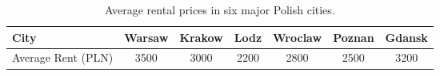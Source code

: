 \begin{table}[h]
    \centering
    \begin{tabular}{lcccccc}
        \toprule
        City & Warsaw & Krakow & Lodz & Wroclaw & Poznan & Gdansk \\
        \midrule
        Average Rent (PLN) & 3500 & 3000 & 2200 & 2800 & 2500 & 3200 \\
        \bottomrule
    \end{tabular}
    \caption{Average rental prices in six major Polish cities.}
    \label{tab:rental_prices}
\end{table}
